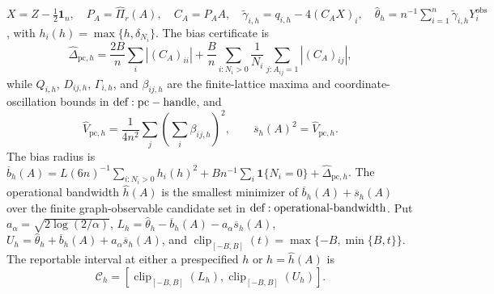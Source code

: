 \(X=Z-\tfrac12\mathbf1_n,\quad P_A=\widehat\Pi_r(A),\quad C_A=P_AA,\quad \widetilde\gamma_{i,h}=q_{i,h}-4(C_AX)_i,\quad \widehat\theta_h=n^{-1}\sum_{i=1}^n\widetilde\gamma_{i,h}Y_i^{\mathrm{obs}}\), with \(h_i(h)=\max\{h,\delta_{N_i}\}\).  The bias certificate is
\[
 \widehat\Delta_{\mathrm{pc},h}=\frac{2B}{n}\sum_i|(C_A)_{ii}|+\frac{B}{n}\sum_{i:N_i>0}\frac1{N_i}\sum_{j:A_{ij}=1}|(C_A)_{ij}|,
\]
while \(Q_{i,h}\), \(D_{ij,h}\), \(\Gamma_{i,h}\), and \(\beta_{ij,h}\) are the finite-lattice maxima and coordinate-oscillation bounds in \({\rm def:pc-handle}\), and
\[
 \widehat V_{\mathrm{pc},h}=\frac1{4n^2}\sum_j\left(\sum_i\beta_{ij,h}\right)^2,
 \qquad
 \overline s_h(A)^2=\widehat V_{\mathrm{pc},h}.
\]
The bias radius is \(\overline b_h(A)=L(6n)^{-1}\sum_{i:N_i>0}h_i(h)^2+Bn^{-1}\sum_i\mathbf1\{N_i=0\}+\widehat\Delta_{\mathrm{pc},h}\).  The operational bandwidth \(\widehat h(A)\) is the smallest minimizer of \(\overline b_h(A)+\overline s_h(A)\) over the finite graph-observable candidate set in \({\rm def:operational\text{-}bandwidth}\).  Put \(a_\alpha=\sqrt{2\log(2/\alpha)}\), \(L_h=\widehat\theta_h-\overline b_h(A)-a_\alpha\overline s_h(A)\), \(U_h=\widehat\theta_h+\overline b_h(A)+a_\alpha\overline s_h(A)\), and \(\operatorname{clip}_{[-B,B]}(t)=\max\{-B,\min\{B,t\}\}\).  The reportable interval at either a prespecified \(h\) or \(h=\widehat h(A)\) is
\[
 \mathcal C_h=
 [\operatorname{clip}_{[-B,B]}(L_h),\operatorname{clip}_{[-B,B]}(U_h)].
\]